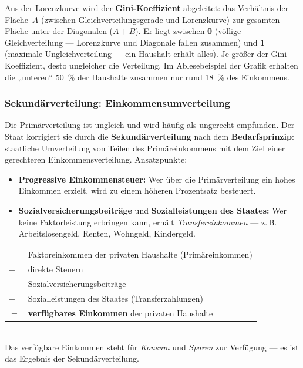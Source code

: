 \documentclass[11pt, a4paper]{article}
\begin{document}
Aus der Lorenzkurve wird der \textbf{Gini-Koeffizient} abgeleitet: das Verhältnis der
Fläche~$A$ (zwischen Gleichverteilungsgerade und Lorenzkurve) zur gesamten Fläche unter
der Diagonalen ($A + B$). Er liegt zwischen \textbf{0} (völlige Gleichverteilung ---
Lorenzkurve und Diagonale fallen zusammen) und \textbf{1} (maximale Ungleichverteilung
--- ein Haushalt erhält alles). Je größer der Gini-Koeffizient, desto ungleicher die
Verteilung. Im Ablesebeispiel der Grafik erhalten die „unteren`` 50~\% der Haushalte
zusammen nur rund 18~\% des Einkommens.

\subsubsection{Sekundärverteilung: Einkommensumverteilung}

Die Primärverteilung ist ungleich und wird häufig als ungerecht empfunden. Der Staat
korrigiert sie durch die \textbf{Sekundärverteilung} nach dem \textbf{Bedarfsprinzip}:
staatliche Umverteilung von Teilen des Primäreinkommens mit dem Ziel einer gerechteren
Einkommensverteilung. Ansatzpunkte:

\begin{itemize}
  \item \textbf{Progressive Einkommensteuer:} Wer über die Primärverteilung ein hohes
    Einkommen erzielt, wird zu einem höheren Prozentsatz besteuert.
  \item \textbf{Sozialversicherungsbeiträge} und \textbf{Sozialleistungen des Staates:}
    Wer keine Faktorleistung erbringen kann, erhält \emph{Transfereinkommen} --- z.\,B.
    Arbeitslosengeld, Renten, Wohngeld, Kindergeld.
\end{itemize}

\begin{merksatz}[title={\bfseries Formel: Verfügbares Einkommen der privaten Haushalte}]
\begin{tabular}{ll}
  & Faktoreinkommen der privaten Haushalte (Primäreinkommen)\\
$-$ & direkte Steuern\\
$-$ & Sozialversicherungsbeiträge\\
$+$ & Sozialleistungen des Staates (Transferzahlungen)\\
\midrule
$=$ & \textbf{verfügbares Einkommen} der privaten Haushalte
\end{tabular}\\[0.4em]
Das verfügbare Einkommen steht für \emph{Konsum} und \emph{Sparen} zur Verfügung ---
es ist das Ergebnis der Sekundärverteilung.
\end{merksatz}
\end{document}
